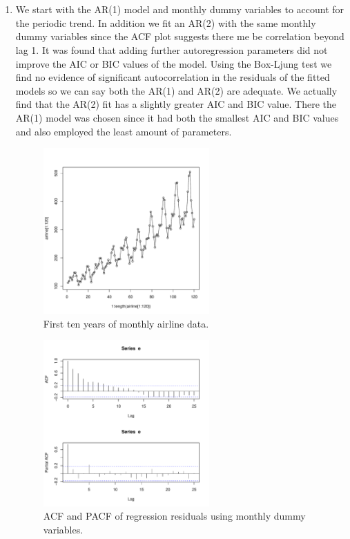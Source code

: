 \documentclass[12pt]{article}
\newenvironment{solution}[2][Solution]{\begin{trivlist}
	\item[\hskip \labelsep {\bfseries #1}]}{\end{trivlist}}
\begin{document}
	\begin{solution}{}
	$ $ \\
	$ $ \\
	\begin{enumerate}[label=(\alph*)]
		\item We start with the AR(1) model and monthly dummy variables to account for the periodic trend. In addition we fit an AR(2) with the same monthly dummy variables since the ACF plot suggests there me be correlation beyond lag 1. It was found that adding further autoregression parameters did not improve the AIC or BIC values of the model. Using the Box-Ljung test we find no evidence of significant autocorrelation in the residuals of the fitted models so we can say both the AR(1) and AR(2) are adequate. We actually find that the AR(2) fit has a slightly greater AIC and BIC value. There the AR(1) model was chosen since it had both the smallest AIC and BIC values and also employed the least amount of parameters. 
		
	\begin{figure}[H]
    		\centering
    		\includegraphics[width=0.6\textwidth]{figs/problem_8/airline.pdf}
    		\caption{First ten years of monthly airline data.}
    		\label{fig:airline}
	\end{figure}
	
	\begin{figure}[H]
    		\centering
    		\includegraphics[width=0.6\textwidth]{figs/problem_8/acf_and_pacf.pdf}
    		\caption{ACF and PACF of regression residuals using monthly dummy variables.}
    		\label{fig:acf_and_pacf}
	\end{figure}
		

\end{enumerate}
\end{solution}
\end{document}
